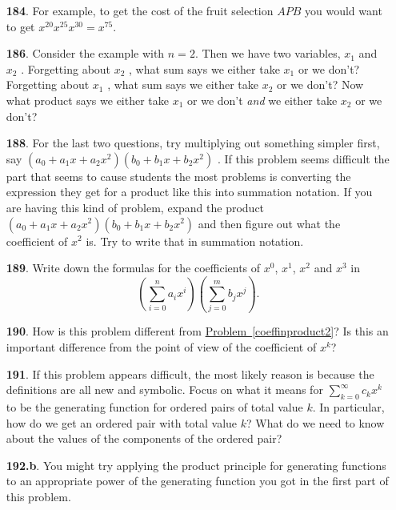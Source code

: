 \documentclass[10pt,]{book}
\theoremstyle{plain}
\theoremstyle{definition}
\theoremstyle{definition}
\numberwithin{equation}{chapter}
\begin{document}
\begin{itemize}[itemsep=1em]
\item[\textbf{184}.]\hypertarget{p-1066}{}%
For example, to get the cost of the fruit selection \(AP B\) you would want to get \(x^{20} x^{25} x^{30} = x^{75}\).%

\item[\textbf{186}.]\hypertarget{p-1071}{}%
Consider the example with \(n = 2\). Then we have two variables, \(x_1\) and \(x_2\) .  Forgetting about \(x_2\) , what sum says we either take \(x_1\) or we don't? Forgetting about \(x_1\) , what sum says we either take \(x_2\) or we don't? Now what product says we either take \(x_1\) or we don't \emph{and} we either take \(x_2\) or we don't?%

\item[\textbf{188}.]\hypertarget{p-1080}{}%
For the last two questions, try multiplying out something simpler first, say \((a_0 + a_1 x + a_2 x^2 )(b_0 + b_1 x + b_2 x^2 )\) . If this problem seems difficult the part that seems to cause students the most problems is converting the expression they get for a product like this into summation notation. If you are having this kind of problem, expand the product \((a_0 + a_1 x + a_2 x^2 )(b_0 + b_1 x + b_2 x^2 )\) and then figure out what the coefficient of \(x^2\) is. Try to write that in summation notation.%

\item[\textbf{189}.]\hypertarget{p-1084}{}%
Write down the formulas for the coefficients of \(x^0\), \(x^1\), \(x^2\) and \(x^3\) in%
\begin{equation*}
\left(\sum_{i=0}^n a_ix^i\right)\left(\sum_{j=0}^m b_jx^j\right)\text{.}
\end{equation*}
%

\item[\textbf{190}.]\hypertarget{p-1087}{}%
How is this problem different from \hyperref[coeffinproduct2]{Problem~\ref{coeffinproduct2}}? Is this an important difference from the point of view of the coefficient of \(x^k\)?%

\item[\textbf{191}.]\hypertarget{p-1092}{}%
If this problem appears difficult, the most likely reason is because the definitions are all new and symbolic. Focus on what it means for \(\sum_{k=0}^\infty c_kx^k\) to be the generating function for ordered pairs of total value \(k\). In particular, how do we get an ordered pair with total value \(k\)? What do we need to know about the values of the components of the ordered pair?%

\item[\textbf{192.b}.]\hypertarget{p-1101}{}%
You might try applying the product principle for generating functions to an appropriate power of the generating function you got in the first part of this problem.%


\end{itemize}
\end{document}
